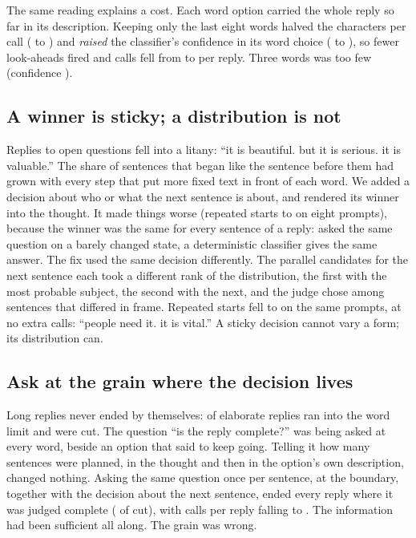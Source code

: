 \documentclass[10pt,twocolumn]{article}
\newcommand{\jev}[1]{``\textsf{#1}''}
\begin{document}
The same reading explains a cost. Each word option carried the whole reply so far in its
description. Keeping only the last eight words halved the characters per call
(\WinFullChars{} to \WinEightChars{}) and \emph{raised} the classifier's confidence in its word
choice (\WinFullConf{} to \WinEightConf{}), so fewer look-aheads fired and calls fell from
\WinFullCalls{} to \WinEightCalls{} per reply. Three words was too few (confidence \WinThreeConf{}).

\subsection{A winner is sticky; a distribution is not}\label{sec:sticky}

Replies to open questions fell into a litany: \jev{it is beautiful. but it is serious. it is
valuable.} The share of sentences that began like the sentence before them had grown with every
step that put more fixed text in front of each word. We added a decision about who or what the next
sentence is about, and rendered its winner into the thought. It made things worse (repeated starts
\StartBefore{} to \StartWinner{} on eight prompts), because the winner was the same for every
sentence of a reply: asked the same question on a barely changed state, a deterministic classifier
gives the same answer. The fix used the same decision differently. The parallel candidates for the
next sentence each took a different rank of the distribution, the first with the most probable
subject, the second with the next, and the judge chose among sentences that differed in frame.
Repeated starts fell to \StartSpread{} on the same prompts, at no extra calls:
\jev{people need it. it is vital.} A sticky decision cannot vary a form; its distribution can.

\subsection{Ask at the grain where the decision lives}

Long replies never ended by themselves: \CapBefore{} of \CapBeforeN{} elaborate replies ran into
the word limit and were cut. The question ``is the reply complete?'' was being asked at every word,
beside an option that said to keep going. Telling it how many sentences were planned, in the thought
and then in the option's own description, changed nothing. Asking the same question once per
sentence, at the boundary, together with the decision about the next sentence, ended every reply
where it was judged complete (\CapAfter{} of \CapAfterN{} cut), with \EndCallsBefore{} calls per
reply falling to \EndCallsAfter{}. The information had been sufficient all along. The grain was
wrong.
\end{document}
